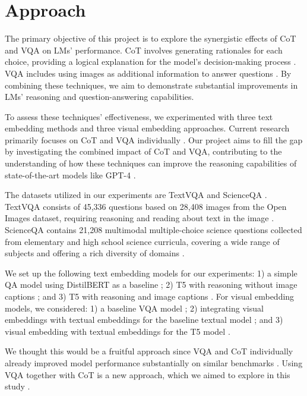 \documentclass[10pt,twocolumn,letterpaper]{article}
\begin{document}
\section{Approach}

The primary objective of this project is to explore the synergistic effects of CoT and VQA on LMs' performance. CoT involves generating rationales for each choice, providing a logical explanation for the model's decision-making process \cite{Wei22}. VQA includes using images as additional information to answer questions \cite{Singh19}. By combining these techniques, we aim to demonstrate substantial improvements in LMs' reasoning and question-answering capabilities.

To assess these techniques' effectiveness, we experimented with three text embedding methods and three visual embedding approaches. Current research primarily focuses on CoT and VQA individually \cite{Wei22, Singh19}. Our project aims to fill the gap by investigating the combined impact of CoT and VQA, contributing to the understanding of how these techniques can improve the reasoning capabilities of state-of-the-art models like GPT-4 \cite{SOTA23}.

The datasets utilized in our experiments are TextVQA and ScienceQA \cite{TextVQA, ScienceQA}. TextVQA consists of 45,336 questions based on 28,408 images from the Open Images dataset, requiring reasoning and reading about text in the image \cite{Singh19}. ScienceQA contains 21,208 multimodal multiple-choice science questions collected from elementary and high school science curricula, covering a wide range of subjects and offering a rich diversity of domains \cite{ScienceQA} .

We set up the following text embedding models for our experiments: 1) a simple QA model using DistilBERT as a baseline \cite{Sanh19}; 2) T5 with reasoning without image captions \cite{Khashabi20}; and 3) T5 with reasoning and image captions \cite{Khashabi20}. For visual embedding models, we considered: 1) a baseline VQA model \cite{Li19}; 2) integrating visual embeddings with textual embeddings for the baseline textual model \cite{Lu19}; and 3) visual embedding with textual embeddings for the T5 model \cite{Kim21}.

We thought this would be a fruitful approach since VQA and CoT individually already improved model performance substantially on similar benchmarks \cite{Wei22, Singh19}. Using VQA together with CoT is a new approach, which we aimed to explore in this study \cite{SOTA23}.
\end{document}

